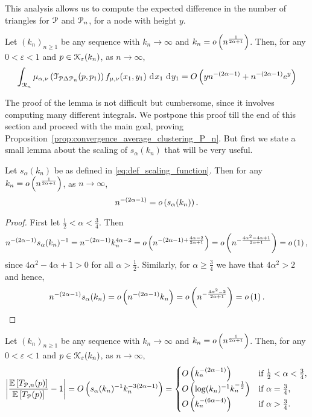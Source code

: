 This analysis allows us to compute the expected difference in the number of triangles for ${\mathcal P}$ and ${\mathcal P}_n$, for a node with height $y$. 

\begin{lemma}\label{lem:clustering_error_T_term}
Let $(k_n)_{n \ge 1}$ be any sequence with $k_n \to \infty$ and $k_n = o\left(n^{\frac{1}{2\alpha + 1}}\right)$. Then, for any $0 < \varepsilon < 1$ and $p \in {\mathcal K}_{\varepsilon}(k_n)$, as $n \to \infty$,
\[
	\int_{{\mathcal R}_n} \mu_{\alpha, \nu}\left(\mathcal{T}_{{\mathcal P} \Delta {\mathcal P}_n}(p,p_1)\right) f_{\mu, \nu}(x_1,y_1) 
	\operatorname{\, \mathrm{d}\hspace{-1pt}} x_1 \operatorname{\, \mathrm{d}\hspace{-1pt}} y_1 = O\left(y n^{-(2\alpha - 1)} + n^{-(2\alpha-1)} e^{y}\right)
\]
\end{lemma}

The proof of the lemma is not difficult but cumbersome, since it involves computing many different integrals. We postpone this proof till the end of this section and proceed with the main goal, proving Proposition~\ref{prop:convergence_average_clustering_P_n}. But first we state a small lemma about the scaling of $s_\alpha(k_n)$ that will be very useful.  

\begin{lemma}\label{lem:scaling_s_alpha}
Let $s_\alpha(k_n)$ be as defined in \eqref{eq:def_scaling_function}. Then for any $k_n = o\left(n^{\frac{1}{2\alpha + 1}}\right)$, as $n \to \infty$,
\[
	n^{-(2\alpha - 1)} = o\left(s_\alpha(k_n)\right).
\]
\end{lemma}

\begin{proof}
First let $\frac{1}{2} < \alpha < \frac{3}{4}$. Then
\[
	n^{-(2\alpha - 1)}s_\alpha(k_n)^{-1} = n^{-(2\alpha -1)}k_n^{4\alpha - 2}
	= o\left(n^{-(2\alpha - 1) + \frac{4\alpha - 2}{2\alpha + 1}}\right) 
	= o\left(n^{-\frac{4\alpha^2 - 4\alpha + 1}{2\alpha + 1}}\right)
	= o\left(1\right),
\]
since $4\alpha^2 - 4\alpha + 1 > 0$ for all $\alpha > \frac{1}{2}$. Similarly, for $\alpha \ge \frac{3}{4}$ we have
that $4\alpha^2 > 2$ and hence,
\[
	n^{-(2\alpha - 1)} s_{\alpha}(k_n) = o\left(n^{-(2\alpha - 1)} k_n\right) = o\left(n^{-\frac{4\alpha^2 - 2}{2\alpha + 1}}\right)
	= o\left(1\right).
\]
\end{proof}

\begin{corollary}\label{cor:clustering_error_T_term}
Let $(k_n)_{n \ge 1}$ be any sequence with $k_n \to \infty$ and $k_n = o\left(n^{\frac{1}{2\alpha + 1}}\right)$. Then, for any $0 < \varepsilon < 1$ and $p \in {\mathcal K}_{\varepsilon}(k_n)$, as $n \to \infty$,
\[
	\left|\frac{\mathbb{E}\left[T_{{\mathcal P},n}(p)\right]}{\mathbb{E}\left[T_{{\mathcal P}}(p)\right]} - 1\right| = O\left(s_\alpha(k_n)^{-1} k_n^{-3(2\alpha - 1)}\right) =
	\begin{cases}
		O\left(k_n^{-(2\alpha - 1)}\right) &\mbox{if } \frac{1}{2} < \alpha < \frac{3}{4},\\
				O\left(\log(k_n)^{-1} k_n^{-\frac{1}{2}}\right) &\mbox{if } \alpha = \frac{3}{4},\\
				O\left(k_n^{-(6\alpha-4)}\right) &\mbox{if } \alpha > \frac{3}{4}.
	\end{cases}
\]
\end{corollary}

